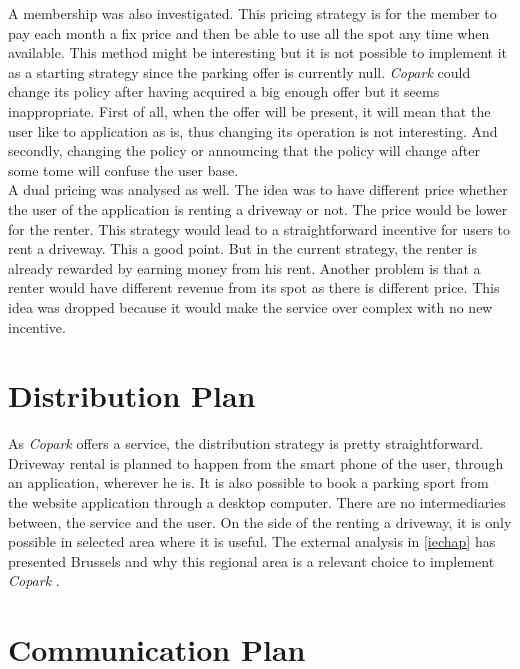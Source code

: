 \documentclass[12pt,a4paper,oneside]{book}
\newcommand{\bp}{\textit{Copark }}
\begin{document}
A membership was also investigated. This pricing strategy is for the member to pay each month a fix price and then be able to use all the spot any time when available. This method might be interesting but it is not possible to implement it as a starting strategy since the parking offer is currently null. \bp could change its policy after having acquired a big enough offer but it seems inappropriate. First of all, when the offer will be present, it will mean that the user like to application as is, thus changing its operation is not interesting. And secondly, changing the policy or announcing that the policy will change after some tome will confuse the user base.\\

A dual pricing was analysed as well. The idea was to have different price whether the user of the application is renting a driveway or not. The price would be lower for the renter. This strategy would lead to a straightforward incentive for users to rent a driveway. This a good point. But in the current strategy, the renter is already rewarded by earning money from his rent. Another problem is that a renter would have different revenue from its spot as there is different price. This idea was dropped because it would make the service over complex with no new incentive.

\section{Distribution Plan}

As \bp offers a service, the distribution strategy is pretty straightforward. Driveway rental is planned to happen from the smart phone of the user, through an application, wherever he is. It is also possible to book a parking sport from the website application through a desktop computer. There are no intermediaries between, the service and the user. On the side of the renting a driveway, it is only possible in selected area where it is useful. The external analysis in \autoref{iechap} has presented Brussels and why this regional area is a relevant choice to implement \bp.

\section{Communication Plan}
\end{document}
